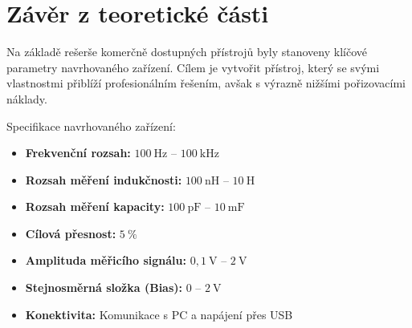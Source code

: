 \section{Závěr z teoretické části}
Na základě rešerše komerčně dostupných přístrojů \cite{Keysight_U1732C_Datasheet} \cite{RS_LCX_Datasheet} byly stanoveny 
klíčové parametry navrhovaného zařízení. Cílem je vytvořit přístroj, který se svými vlastnostmi přiblíží 
profesionálním řešením, avšak s výrazně nižšími pořizovacími náklady. 

Specifikace navrhovaného zařízení:
\begin{itemize}
    \item \textbf{Frekvenční rozsah:} $100~\mathrm{Hz}$ -- $100~\mathrm{kHz}$
    \item \textbf{Rozsah měření indukčnosti:} $100~\mathrm{nH}$ -- $10~\mathrm{H}$
    \item \textbf{Rozsah měření kapacity:} $100~\mathrm{pF}$ -- $10~\mathrm{mF}$
    \item \textbf{Cílová přesnost:} $5~\%$
    \item \textbf{Amplituda měřicího signálu:} $0{,}1~\mathrm{V}$ -- $2~\mathrm{V}$
    \item \textbf{Stejnosměrná složka (Bias):} $0$ -- $2~\mathrm{V}$
    \item \textbf{Konektivita:} Komunikace s PC a napájení přes USB
\end{itemize}